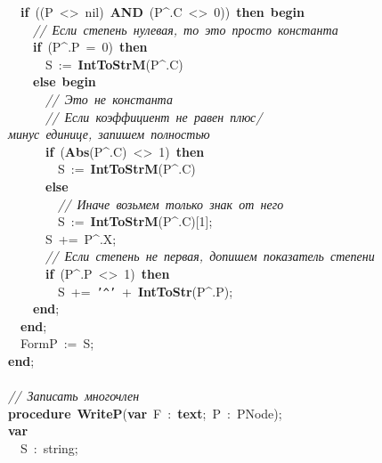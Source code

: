\mbox{}\ \ \textbf{if}\ ((P\ \textless{}\textgreater{}\ nil)\ \textbf{AND}\ (P\textasciicircum{}.C\ \textless{}\textgreater{}\ 0))\ \textbf{then}\ \textbf{begin} \\
\mbox{}\ \ \ \ \textit{//\ Если\ степень\ нулевая,\ то\ это\ просто\ константа} \\
\mbox{}\ \ \ \ \textbf{if}\ (P\textasciicircum{}.P\ =\ 0)\ \textbf{then} \\
\mbox{}\ \ \ \ \ \ S\ :=\ \textbf{IntToStrM}(P\textasciicircum{}.C) \\
\mbox{}\ \ \ \ \textbf{else}\ \textbf{begin} \\
\mbox{}\ \ \ \ \ \ \textit{//\ Это\ не\ константа} \\
\mbox{}\ \ \ \ \ \ \textit{//\ Если\ коэффициент\ не\ равен\ плюс/минус\ единице,\ запишем\ полностью} \\
\mbox{}\ \ \ \ \ \ \textbf{if}\ (\textbf{Abs}(P\textasciicircum{}.C)\ \textless{}\textgreater{}\ 1)\ \textbf{then} \\
\mbox{}\ \ \ \ \ \ \ \ S\ :=\ \textbf{IntToStrM}(P\textasciicircum{}.C) \\
\mbox{}\ \ \ \ \ \ \textbf{else} \\
\mbox{}\ \ \ \ \ \ \ \ \textit{//\ Иначе\ возьмем\ только\ знак\ от\ него} \\
\mbox{}\ \ \ \ \ \ \ \ S\ :=\ \textbf{IntToStrM}(P\textasciicircum{}.C)[1]; \\
\mbox{}\ \ \ \ \ \ S\ +=\ P\textasciicircum{}.X; \\
\mbox{}\ \ \ \ \ \ \textit{//\ Если\ степень\ не\ первая,\ допишем\ показатель\ степени} \\
\mbox{}\ \ \ \ \ \ \textbf{if}\ (P\textasciicircum{}.P\ \textless{}\textgreater{}\ 1)\ \textbf{then} \\
\mbox{}\ \ \ \ \ \ \ \ S\ +=\ \texttt{'\textasciicircum{}'}\ +\ \textbf{IntToStr}(P\textasciicircum{}.P); \\
\mbox{}\ \ \ \ \textbf{end}; \\
\mbox{}\ \ \textbf{end}; \\
\mbox{}\ \ FormP\ :=\ S; \\
\mbox{}\textbf{end}; \\
\mbox{} \\
\mbox{}\textit{//\ Записать\ многочлен} \\
\mbox{}\textbf{procedure}\ \textbf{WriteP}(\textbf{var}\ F\ :\ \textbf{text};\ P\ :\ PNode); \\
\mbox{}\textbf{var} \\
\mbox{}\ \ S\ :\ string; \\

